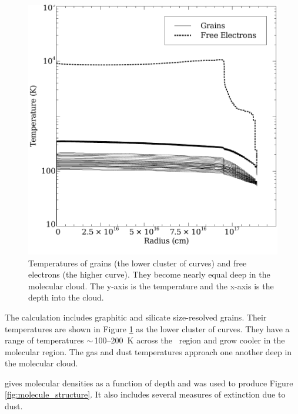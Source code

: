 \documentclass[12pt,twoside]{article}
\begin{document}
{\begin{figure}
\begin{center}
\includegraphics[clip=on,width=0.8\columnwidth,height=0.8\textheight,keepaspectratio]{grain_temperature}
\end{center}
\caption{Temperatures of grains (the lower
cluster of curves) and free electrons
(the higher curve).  They become nearly equal deep in the molecular cloud.
The y-axis is the temperature and the x-axis is the depth into the cloud.}
\label{fig:grain_temperature}
\end{figure}

The calculation includes graphitic and silicate size-resolved grains.
Their temperatures are shown in Figure \ref{fig:grain_temperature}
as the lower cluster of curves.
They have a range of temperatures
$\sim\,$100--200~K across the \hplus\
region and grow cooler in the molecular region.
The gas and dust
temperatures approach one another deep in the molecular cloud.

 gives molecular
densities as a function of depth
and was used to produce Figure \ref{fig:molecule_structure}.
It also includes several
measures of extinction due to dust.

}
\end{document}
